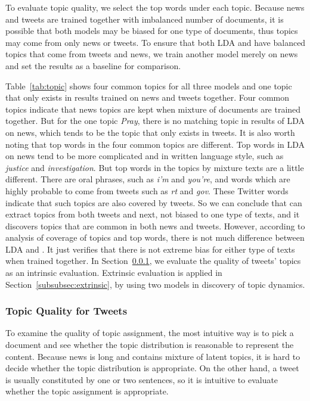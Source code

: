 To evaluate topic quality, we select the top words under each topic. Because news and tweets are trained together with imbalanced number of documents, it is possible that both models may be biased for one type of documents, thus topics may come from only news or tweets. To ensure that both LDA and \stlda have balanced topics that come from tweets and news, we train another model merely on news and set the results as a baseline for comparison.

Table~\ref{tab:topic} shows four common topics for all three models and one topic that only exists in results trained on news and tweets together. Four common topics indicate that news topics are kept when mixture of documents are trained together. But for the one topic \emph{Pray}, there is no matching topic in results of LDA on news, which tends to be the topic that only exists in tweets. It is also worth noting that top words in the four common topics are different. Top words in LDA on news tend to be more complicated and in written language style, such as \emph{justice} and \emph{investigation}. But top words in the topics by mixture texts are a little different. There are oral phrases, such as \emph{i'm} and \emph{you're}, and words which are highly probable to come from tweets such as \emph{rt} and \emph{gov}. These Twitter words indicate that such topics are also covered by tweets. So we can conclude that \stlda can extract topics from both tweets and next, not biased to one type of texts, and it discovers topics that are common in both news and tweets. However, according to analysis of coverage of topics and top words, there is not much difference between LDA and \stlda. It just verifies that there is not extreme bias for either type of texts when trained together. In Section~\ref{subsubsec:intrinsic}, we evaluate the quality of tweets' topics as an intrinsic evaluation. Extrinsic evaluation is applied in Section~\ref{subsubsec:extrinsic}, by using two models in discovery of topic dynamics.

\subsubsection{Topic Quality for Tweets}
\label{subsubsec:intrinsic}

To examine the quality of topic assignment, the most intuitive way is to pick a document and see whether the topic distribution is reasonable to represent the content. Because news is long and contains mixture of latent topics, it is hard to decide whether the topic distribution is appropriate. On the other hand, a tweet is usually constituted by one or two sentences, so it is intuitive to evaluate whether the topic assignment is appropriate.

